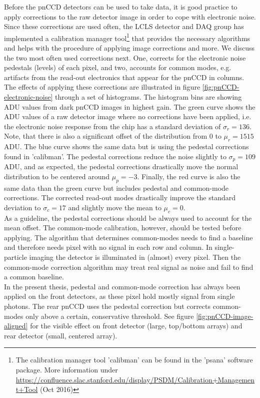 Before the pnCCD detectors can be used to take data, it is good practice to apply corrections to the raw detector image in order to cope with electronic noise. Since these corrections are used often, the LCLS detector and DAQ group has implemented a calibration manager tool\footnote{The calibration manager tool 'calibman' can be found in the 'psana' software package. More information under \url{https://confluence.slac.stanford.edu/display/PSDM/Calibration+Management+Tool} (Oct 2016)} that provides the necessary algorithms and helps with the procedure of applying image corrections and more. We discuss the two most often used corrections next. One, corrects for the electronic noise pedestals (levels) of each pixel, and two, accounts for common modes, e.g. artifacts from the read-out electronics that appear for the pnCCD in columns.\\
%
The effects of applying these corrections are illustrated in figure \ref{fig:pnCCD-electronic-noise} through a set of histograms. The histogram bins are showing ADU values from dark pnCCD images in highest gain. The green curve shows the ADU values of a raw detector image where no corrections have been applied, i.e. the electronic noise response from the chip has a standard deviation of $\sigma_{r}=136$. Note, that there is also a significant offset of the distribution from 0 to $\mu_{r}=1515$ ADU. The blue curve shows the same data but is using the pedestal corrections found in 'calibman'. The pedestal corrections reduce the noise slightly to $\sigma_{p}=109$ ADU, and as expected, the pedestal corrections drastically move the normal distribution to be centered around $\mu_{p}=-3$. Finally, the red curve is also the same data than the green curve but includes pedestal and common-mode corrections. The corrected read-out modes drastically improve the standard deviation to $\sigma_{c}=17$ and slightly move the mean to $\mu_{c}=0$.\\
As a guideline, the pedestal corrections should be always used to account for the mean offset. The common-mode calibration, however, should be tested before applying. The algorithm that determines common-modes needs to find a baseline and therefore needs pixel with no signal in each row and column. In single-particle imaging the detector is illuminated in (almost) every pixel. Then the common-mode correction algorithm may treat real signal as noise and fail to find a common baseline.\\
In the present thesis, pedestal and common-mode correction has always been applied on the front detectors, as these pixel hold mostly signal from single photons. The rear pnCCD uses the pedestal correction but corrects common-modes only above a certain, conservative threshold. See figure \ref{fig:pnCCD-image-aligned} for the visible effect on front detector (large, top/bottom arrays) and rear detector (small, centered array).\\
